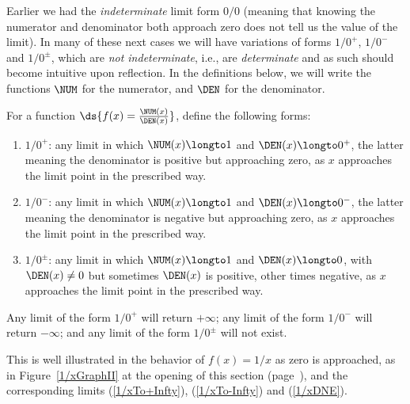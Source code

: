Earlier we had the {\it indeterminate} limit form $0/0$ (meaning that
knowing the numerator and denominator both approach zero does
not tell us the value of the limit).
In many of these next cases we will have  variations of 
forms $1/0^+$, $1/0^-$ and $1/0^{\pm}$, which are {\it not
indeterminate}, i.e., are {\it determinate}
and as such should become intuitive upon reflection.
In the definitions below, we will write the functions
$\NUM$ for the numerator, and $\DEN$ for the denominator.
\begin{definition} For a function $\ds{f(x)=\frac{\NUM(x)}{\DEN(x)}}$,
define the following forms:
\begin{enumerate}
\item $1/0^+$: any limit in which $\NUM(x)\longto1$ and $\DEN(x)\longto0^+$,
               the latter meaning
               the denominator is positive but approaching zero,
               as $x$ approaches the limit point in the prescribed way.
\item $1/0^-$: any limit in which $\NUM(x)\longto1$ and $\DEN(x)\longto0^-$,
               the latter meaning 
               the denominator is negative but approaching zero,
               as $x$ approaches the limit point in the prescribed way.
\item $1/0^{\pm}$: any limit in which $\NUM(x)\longto1$ and
               $\DEN(x)\longto0$, with $\DEN(x)\ne0$ but sometimes
               $\DEN(x)$ is positive, other times negative,
               as $x$ approaches the limit point in the prescribed way.
\end{enumerate}
\end{definition}
\begin{theorem} Any limit of the form $1/0^+$ will return $+\infty$;
any limit of the form $1/0^-$ will return $-\infty$; and
any limit of the form $1/0^\pm$ will not exist. 
\end{theorem}
This is well illustrated in the behavior of $f(x)=1/x$
as zero is approached, as in Figure~\ref{1/xGraphII}
at the opening of this section (page~\pageref{1/xGraphII}), and the
corresponding limits (\ref{1/xTo+Infty}), (\ref{1/xTo-Infty})
and (\ref{1/xDNE}).

